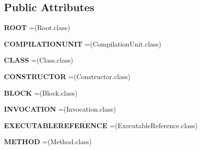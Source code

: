 \subsection*{Public Attributes}
\begin{DoxyCompactItemize}
\item 
{\bfseries R\+O\+OT} =(Root.\+class)\hypertarget{enumparser_1_1_class_selector_a2faead7d08ee05c27b99d2ad1a88aa25}{}\label{enumparser_1_1_class_selector_a2faead7d08ee05c27b99d2ad1a88aa25}

\item 
{\bfseries C\+O\+M\+P\+I\+L\+A\+T\+I\+O\+N\+U\+N\+IT} =(Compilation\+Unit.\+class)\hypertarget{enumparser_1_1_class_selector_a8bc13bc016c86f465b75340609c789c5}{}\label{enumparser_1_1_class_selector_a8bc13bc016c86f465b75340609c789c5}

\item 
{\bfseries C\+L\+A\+SS} =(Class.\+class)\hypertarget{enumparser_1_1_class_selector_a8abc648cbe7bfc8860d5b39052ffa130}{}\label{enumparser_1_1_class_selector_a8abc648cbe7bfc8860d5b39052ffa130}

\item 
{\bfseries C\+O\+N\+S\+T\+R\+U\+C\+T\+OR} =(Constructor.\+class)\hypertarget{enumparser_1_1_class_selector_a9c8116f05973f3b124f2e1a1278e9d8a}{}\label{enumparser_1_1_class_selector_a9c8116f05973f3b124f2e1a1278e9d8a}

\item 
{\bfseries B\+L\+O\+CK} =(Block.\+class)\hypertarget{enumparser_1_1_class_selector_ae2031e432b486d1b6ad1057147a4175c}{}\label{enumparser_1_1_class_selector_ae2031e432b486d1b6ad1057147a4175c}

\item 
{\bfseries I\+N\+V\+O\+C\+A\+T\+I\+ON} =(Invocation.\+class)\hypertarget{enumparser_1_1_class_selector_a3dd2a046afa37b84da46c268dfa1916f}{}\label{enumparser_1_1_class_selector_a3dd2a046afa37b84da46c268dfa1916f}

\item 
{\bfseries E\+X\+E\+C\+U\+T\+A\+B\+L\+E\+R\+E\+F\+E\+R\+E\+N\+CE} =(Executable\+Reference.\+class)\hypertarget{enumparser_1_1_class_selector_af75d4eba7e96b10fef054373deb5d696}{}\label{enumparser_1_1_class_selector_af75d4eba7e96b10fef054373deb5d696}

\item 
{\bfseries M\+E\+T\+H\+OD} =(Method.\+class)\hypertarget{enumparser_1_1_class_selector_a49e079a80869febee9490a27de57134d}{}\label{enumparser_1_1_class_selector_a49e079a80869febee9490a27de57134d}


\end{DoxyCompactItemize}
